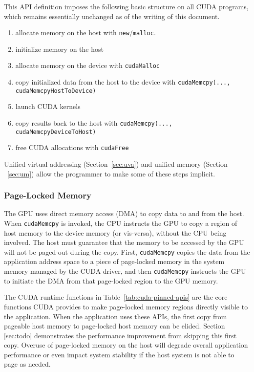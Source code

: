 This API definition imposes the following basic structure on all CUDA programs, which remains essentially unchanged as of the writing of this document.
\begin{enumerate}
	\item allocate memory on the host with \texttt{new}/\texttt{malloc}.
	\item initialize memory on the host
	\item allocate memory on the device with \texttt{cudaMalloc}
	\item copy initialized data from the host to the device with \texttt{cudaMemcpy(..., cudaMemcpyHostToDevice)}
	\item launch CUDA kernels
	\item copy results back to the host with \texttt{cudaMemcpy(..., cudaMemcpyDeviceToHost)}
	\item free CUDA allocations with \texttt{cudaFree}
\end{enumerate}

Unified virtual addressing (Section~\ref{sec:uva}) and unified memory (Section ~\ref{sec:um}) allow the programmer to make some of these steps implicit.



\subsubsection{Page-Locked Memory}

The GPU uses direct memory access (DMA) to copy data to and from the host.
When \texttt{cudaMemcpy} is invoked, the CPU instructs the GPU to copy a region of host memory to the device memory (or vis-versa), without the CPU being involved.
The host must guarantee that the memory to be accessed by the GPU will not be paged-out during the copy.
First, \texttt{cudaMemcpy} copies the data from the application address space to a piece of page-locked memory in the system memory managed by the CUDA driver, and then \texttt{cudaMemcpy} instructs the GPU to initiate the DMA from that page-locked region to the GPU memory.

The CUDA runtime functions in Table~\ref{tab:cuda-pinned-apis} are the core functions CUDA provides to make page-locked memory regions directly visible to the application.
When the application uses these APIs, the first copy from pageable host memory to page-locked host memory can be elided.
Section \ref{sec:todo} demonstrates the performance improvement from skipping this first copy.
Overuse of page-locked memory on the host will degrade overall application performance or even impact system stability if the host system is not able to page as needed.

